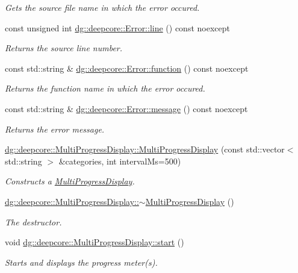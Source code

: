 \begin{DoxyCompactItemize}
\begin{DoxyCompactList}\small\item\em Gets the source file name in which the error occured. \end{DoxyCompactList}\item 
const unsigned int \hyperlink{group___utility_module_ga13437b5caffe754b7a32fc3c514907e5}{dg\+::deepcore\+::\+Error\+::line} () const noexcept
\begin{DoxyCompactList}\small\item\em Returns the source line number. \end{DoxyCompactList}\item 
const std\+::string \& \hyperlink{group___utility_module_gaa69c98222c56544a9094154a8eab4db9}{dg\+::deepcore\+::\+Error\+::function} () const noexcept
\begin{DoxyCompactList}\small\item\em Returns the function name in which the error occured. \end{DoxyCompactList}\item 
const std\+::string \& \hyperlink{group___utility_module_ga7269ba8049ed86338733955565242539}{dg\+::deepcore\+::\+Error\+::message} () const noexcept
\begin{DoxyCompactList}\small\item\em Returns the error message. \end{DoxyCompactList}\item 
\hyperlink{group___utility_module_ga51c18fad87e104455921392fc91a7c03}{dg\+::deepcore\+::\+Multi\+Progress\+Display\+::\+Multi\+Progress\+Display} (const std\+::vector$<$ std\+::string $>$ \&categories, int interval\+Ms=500)
\begin{DoxyCompactList}\small\item\em Constructs a \hyperlink{classdg_1_1deepcore_1_1_multi_progress_display}{Multi\+Progress\+Display}. \end{DoxyCompactList}\item 
\hyperlink{group___utility_module_gae12a350c3384d98843cd2851dcaa10fe}{dg\+::deepcore\+::\+Multi\+Progress\+Display\+::$\sim$\+Multi\+Progress\+Display} ()
\begin{DoxyCompactList}\small\item\em The destructor. \end{DoxyCompactList}\item 
void \hyperlink{group___utility_module_gaa7547dfd4650dc8a0f761b174ce24450}{dg\+::deepcore\+::\+Multi\+Progress\+Display\+::start} ()
\begin{DoxyCompactList}\small\item\em Starts and displays the progress meter(s). \end{DoxyCompactList}\item 

\end{DoxyCompactItemize}
